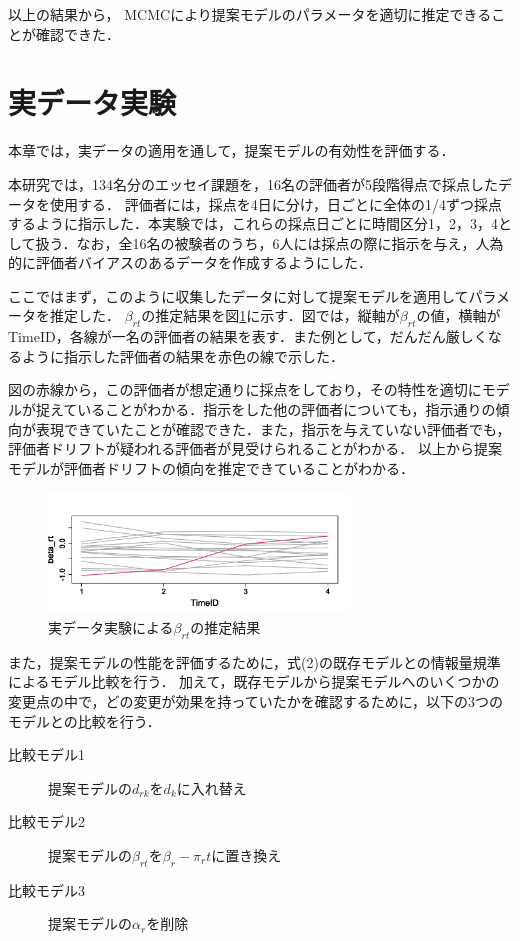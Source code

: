 \documentclass[dvipdfmx, twocolumn, a4paper]{hcresume}
\begin{document}
以上の結果から， MCMCにより提案モデルのパラメータを適切に推定できることが確認できた．

\section{実データ実験}
本章では，実データの適用を通して，提案モデルの有効性を評価する．

本研究では，134名分のエッセイ課題を，16名の評価者が5段階得点で採点したデータを使用する．
評価者には，採点を4日に分け，日ごとに全体の1/4ずつ採点するように指示した．本実験では，これらの採点日ごとに時間区分1，2，3，4として扱う．なお，全16名の被験者のうち，6人には採点の際に指示を与え，人為的に評価者バイアスのあるデータを作成するようにした．

ここではまず，このように収集したデータに対して提案モデルを適用してパラメータを推定した．
$\beta_{rt}$の推定結果を図\ref{beta_rt_data}に示す．図では，縦軸が$\beta_{rt}$の値，横軸がTimeID，各線が一名の評価者の結果を表す．また例として，だんだん厳しくなるように指示した評価者の結果を赤色の線で示した．

図の赤線から，この評価者が想定通りに採点をしており，その特性を適切にモデルが捉えていることがわかる．指示をした他の評価者についても，指示通りの傾向が表現できていたことが確認できた．また，指示を与えていない評価者でも，評価者ドリフトが疑われる評価者が見受けられることがわかる．
以上から提案モデルが評価者ドリフトの傾向を推定できていることがわかる．

\begin{figure}[t]
  \centering
 \includegraphics[width=8cm]{img/beta_rt_img_4.png}
 \caption{実データ実験による$\beta_{rt}$の推定結果}
 \vskip5mm
  \label{beta_rt_data}
\end{figure}
また，提案モデルの性能を評価するために，式(2)の既存モデルとの情報量規準によるモデル比較を行う．
加えて，既存モデルから提案モデルへのいくつかの変更点の中で，どの変更が効果を持っていたかを確認するために，以下の3つのモデルとの比較を行う．

\begin{description}
\item [比較モデル1]提案モデルの$d_{rk}$を$d_k$に入れ替え
\item [比較モデル2]提案モデルの$\beta_{rt}$を$\beta_{r} - \pi_{r}t$に置き換え
\item [比較モデル3]提案モデルの$\alpha_r$を削除
\end{description}
\end{document}
